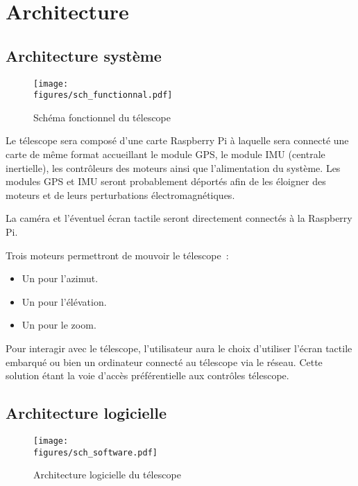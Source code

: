 \chapter{Architecture}
\label{chapter1}

\section{Architecture système}

\begin{figure}[H]
    \centering
    \texttt{[image: \\figures/sch\_functionnal.pdf]}
    \decoRule
    \caption[
    Schéma fonctionnel du télescope]{
    Schéma fonctionnel du télescope}
    \label{fig:Schéma fonctionnel du télescope}
    \end{figure}

\vspace{1cm}

Le télescope sera composé d'une carte Raspberry Pi à laquelle sera connecté une carte de même format accueillant le module GPS, le module IMU (centrale inertielle), les contrôleurs des moteurs ainsi que l'alimentation du système. Les modules GPS et IMU seront probablement déportés afin de les éloigner des moteurs et de leurs perturbations électromagnétiques.

La caméra et l'éventuel écran tactile seront directement connectés à la Raspberry Pi.

Trois moteurs permettront de mouvoir le télescope~:
\begin{itemize}[label=$\bullet$]
	\item Un pour l'azimut.
	\item Un pour l'élévation.
	\item Un pour le zoom.
	\end{itemize}

\vspace{1cm}

Pour interagir avec le télescope, l'utilisateur aura le choix d'utiliser l'écran tactile embarqué ou bien un ordinateur connecté au télescope via le réseau. Cette solution étant la voie d'accès préférentielle aux contrôles télescope.

\section{Architecture logicielle}

\begin{figure}[H]
    \centering
    \texttt{[image: \\figures/sch\_software.pdf]}
    \decoRule
    \caption[
    Architecture logicielle du télescope]{
    Architecture logicielle du télescope}
    \label{fig:Architecture logicielle du télescope}
    \end{figure}

